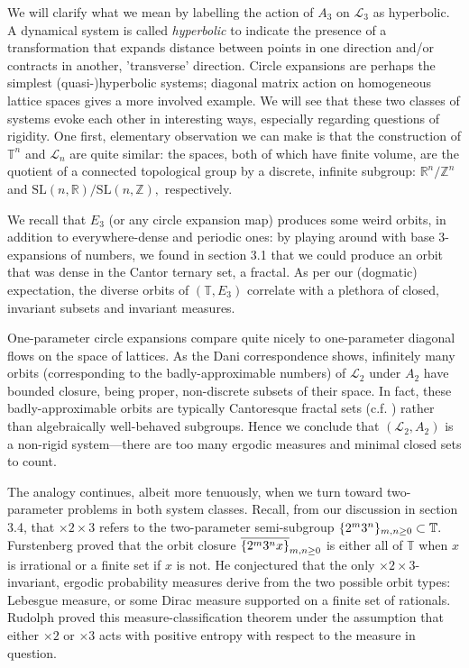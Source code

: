 \documentclass[12pt, letterpaper, oneside]{book}
\newcommand{\R}{\mathbb{R}}
\newcommand{\Z}{\mathbb{Z}}
\newcommand{\T}{\mathbb{T}}
\DeclarePairedDelimiter{\set}{\lbrace}{\rbrace}
\theoremstyle{plain}
\theoremstyle{definition}
\theoremstyle{remark}
\begin{document}
We will clarify what we mean by labelling the action of $A_3$ on $\mathcal{L}_3$ as hyperbolic. A dynamical system is called \textit{hyperbolic} to indicate the presence of a transformation that expands distance between points in one direction and/or contracts in another, 'transverse' direction. Circle expansions are perhaps the simplest (quasi-)hyperbolic systems; diagonal matrix action on homogeneous lattice spaces gives a more involved example. We will see that these two classes of systems evoke each other in interesting ways, especially regarding questions of rigidity. One first, elementary observation we can make is that the construction of $\T^n$ and $\mathcal{L}_n$ are quite similar: the spaces, both of which have finite volume, are the quotient of a connected topological group by a discrete, infinite subgroup: $\R^n/\Z^n$ and $\mbox{SL}(n,\R)/\mbox{SL}(n,\Z),$ respectively.  

We recall that $E_3$ (or any circle expansion map) produces some weird orbits, in addition to everywhere-dense and periodic ones: by playing around with base 3-expansions of numbers, we found in section 3.1 that we could produce an orbit that was dense in the Cantor ternary set, a fractal. As per our (dogmatic) expectation, the diverse orbits of $(\T, E_3)$ correlate with a plethora of closed, invariant subsets and invariant measures.

One-parameter circle expansions compare quite nicely to one-parameter diagonal flows on the space of lattices. As the Dani correspondence shows, infinitely many orbits (corresponding to the badly-approximable numbers) of $\mathcal{L}_2$ under $A_2$ have bounded closure, being proper, non-discrete subsets of their space. In fact, these badly-approximable orbits are typically Cantoresque fractal sets (c.f. \cite{Mor05}) rather than algebraically well-behaved subgroups. Hence we conclude that $(\mathcal{L}_2, A_2)$ is a non-rigid system---there are too many ergodic measures and minimal closed sets to count.

The analogy continues, albeit more tenuously, when we turn toward two-parameter problems in both system classes.  Recall, from our discussion in section 3.4, that $\times2\times3$ refers to the two-parameter semi-subgroup $\set{2^m3^n}_{m,n \geq 0} \subset \T.$ Furstenberg proved that the orbit closure $\overline{\set{2^m3^nx}}_{m,n \geq 0}$ is either all of $\T$ when $x$ is irrational or a finite set if $x$ is not. He conjectured that the only $\times2\times3$-invariant, ergodic probability measures derive from the two possible orbit types: Lebesgue measure, or some Dirac measure supported on a finite set of rationals. Rudolph proved this measure-classification theorem under the assumption that either $\times2$ or $\times3$ acts with positive entropy with respect to the measure in question.
\end{document}
